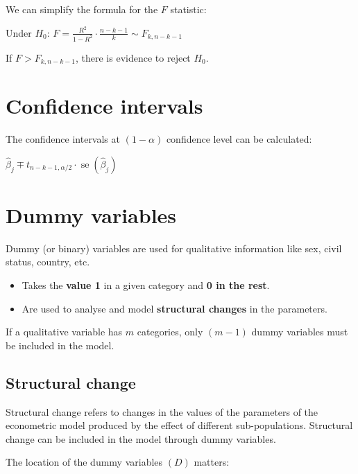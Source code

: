 \documentclass[10pt, a4paper, landscape]{article}
\DeclareMathOperator{\se}{se}
\begin{document}
\begin{multicols}{3}
We can simplify the formula for the \( F \) statistic:

\begin{center}
	Under \( H_{0} \): \quad \( F = \frac{R^{2}}{1 - R^{2}} \cdot \frac{n - k - 1}{k} \sim F_{k, n - k - 1} \)
\end{center}

If \( F > F_{k, n - k - 1} \), there is evidence to reject \( H_{0} \).

\section*{Confidence intervals}

The confidence intervals at \( (1 - \alpha) \) confidence level can be calculated:

\begin{center}
	\( \hat{\beta}_{j} \mp t_{n - k - 1, \alpha / 2} \cdot \se(\hat{\beta}_{j}) \)
\end{center}

\columnbreak

\section*{Dummy variables}

Dummy (or binary) variables are used for qualitative information like sex, civil status, country, etc.

\begin{itemize}[leftmargin=*]
	\item Takes the \textbf{value 1} in a given category and \textbf{0 in the rest}.
	\item Are used to analyse and model \textbf{structural changes} in the parameters.
\end{itemize}

If a qualitative variable has \( m \) categories, only \( (m - 1) \) dummy variables must be included in the model.

\subsection*{Structural change}

Structural change refers to changes in the values of the parameters of the econometric model produced by the effect of different sub-populations. Structural change can be included in the model through dummy variables.

The location of the dummy variables \( (D) \) matters:


\end{multicols}
\end{document}

